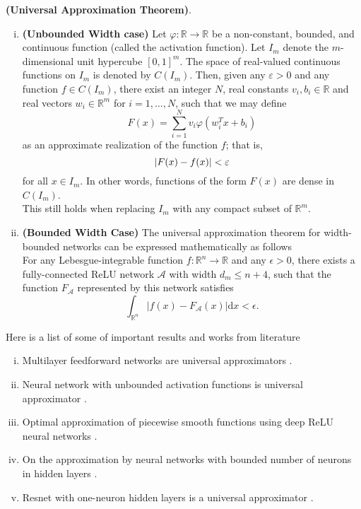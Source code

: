 \begin{thm}
	\label{universal_approximation_theorem}
	\textbf{(Universal Approximation Theorem)}.
	\begin{enumerate}[i.]
		\item \textbf{(Unbounded Width case)} Let $\varphi :\mathbb {R} \to \mathbb {R}$ be a non-constant, bounded, and continuous function (called the activation function). Let $I_{m}$ denote the $m$-dimensional unit hypercube $[0,1]^{m}$. The space of real-valued continuous functions on $I_m$ is denoted by  $C(I_{m})$. Then, given any $\varepsilon > 0$ and any function  $f\in C(I_{m})$, there exist an integer  $N$, real constants $v_{i},b_{i}\in \mathbb  {R}$ and real vectors $w_{i}\in \mathbb {R} ^{m}$ for $i=1,\dots ,N$, such that we may define	
		 \begin{equation*}
		  F(x)=\sum _{{i=1}}^{{N}}v_{i}\varphi \left(w_{i}^{T}x+b_{i}\right)
		 \end{equation*}
		as an approximate realization of the function $f$; that is,
		\begin{equation*}
		\vert F(x) - f (x)\vert  < \varepsilon
		\end{equation*}
		for all $x\in I_{m}$. In other words, functions of the form $F(x)$ are dense in $C(I_{m})$.\\	
		This still holds when replacing $I_m$ with any compact subset of $\mathbb {R} ^{m}$.
		\item \textbf{(Bounded Width Case)} The universal approximation theorem for width-bounded networks can be expressed mathematically as follows\\
		For any Lebesgue-integrable function $f:\mathbb {R} ^{n}\rightarrow \mathbb {R}$ and any $\epsilon >0$, there exists a fully-connected ReLU network $\mathcal {A}$ with width $ d_{m}\leq {n+4}$, such that the function $F_{\mathcal {A}}$ represented by this network satisfies
		\begin{equation*}
		\int _{\mathbb {R} ^{n}}\left|f(x)-F_{\mathcal {A}}(x)\right|\mathrm {d} x<\epsilon.
		\end{equation*}
	\end{enumerate}
\end{thm}
Here is a list of some of important results and works from literature
\begin{enumerate}[i.]
	\item Multilayer feedforward networks are universal approximators \cite{hornik1989multilayer}.
	\item Neural network with unbounded activation functions is universal approximator \cite{sonoda2017neural}.
	\item Optimal approximation of piecewise smooth functions using deep ReLU neural networks \cite{petersen2018optimal}.
	\item On the approximation by neural networks with bounded number of neurons in hidden layers \cite{ismailov2014approximation}.
	\item Resnet with one-neuron hidden layers is a universal approximator \cite{lin2018resnet}.
\end{enumerate}
